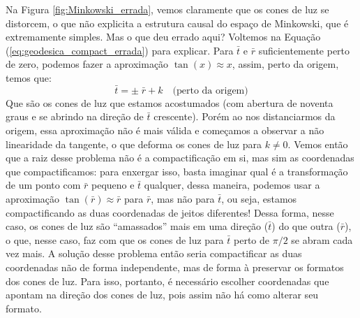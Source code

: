 \begin{comment}
\begin{figure}[h]
    \centering
    \texttt{[image: figuras/Minkowski\_errada.png]}
    \caption{Diagrama nas coordenadas compactificadas $\bar{t}\times\bar{r}$ das geodésicas tipo tempo radiais do espaço-tempo de Minkowski variando a constante $k$ da Equação (\ref{eq:geodesica_compact_errada}). Em azul temos os casos $+$ e em vermelho temos os casos $-$ da Equação (\ref{eq:geodesica_compact_errada}).}
    \label{fig:Minkowski_errada}
\end{figure}
\end{comment}
Na Figura \ref{fig:Minkowski_errada}, vemos claramente que os cones de luz se distorcem, o que não explicita a estrutura causal do espaço de Minkowski, que é extremamente simples. Mas o que deu errado aqui? Voltemos na Equação (\ref{eq:geodesica_compact_errada}) para explicar. Para $\bar{t}$ e $\bar{r}$ suficientemente perto de zero, podemos fazer a aproximação $\tan(x)\approx x$, assim, perto da origem, temos que:
\[\bar{t}=\pm\;\bar{r}+k\quad\text{(perto da origem)}\]
Que são os cones de luz que estamos acostumados (com abertura de noventa graus e se abrindo na direção de $\bar{t}$ crescente). Porém ao nos distanciarmos da origem, essa aproximação não é mais válida e começamos a observar a não linearidade da tangente, o que deforma os cones de luz para $k\neq 0$. Vemos então que a raiz desse problema não é a compactificação em si, mas sim as coordenadas que compactificamos: para enxergar isso, basta imaginar qual é a transformação de um ponto com $\bar{r}$ pequeno e $\bar{t}$ qualquer, dessa maneira, podemos usar a aproximação $\tan(\bar{r})\approx \bar{r}$ para $\bar{r}$, mas não para $\bar{t}$, ou seja, estamos compactificando as duas coordenadas de jeitos diferentes! Dessa forma, nesse caso, os cones de luz são ``amassados'' mais em uma direção ($\bar{t}$) do que outra ($\bar{r}$), o que, nesse caso, faz com que os cones de luz para $\bar{t}$ perto de $\pi/2$ se abram cada vez mais. A solução desse problema então seria compactificar as duas coordenadas não de forma independente, mas de forma à preservar os formatos dos cones de luz. Para isso, portanto, é necessário escolher coordenadas que apontam na direção dos cones de luz, pois assim não há como alterar seu formato.